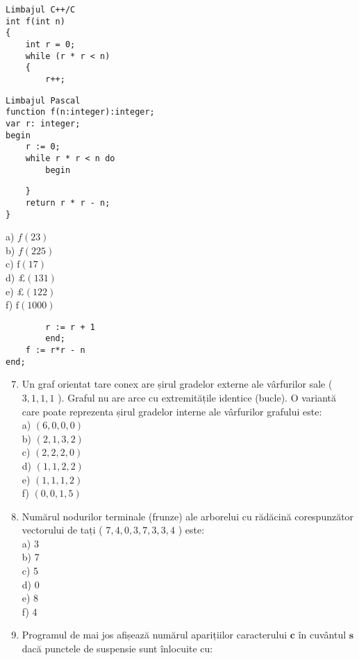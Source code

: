 \begin{verbatim}
Limbajul C++/C
int f(int n)
{
    int r = 0;
    while (r * r < n)
    {
        r++;
\end{verbatim}

\begin{verbatim}
Limbajul Pascal
function f(n:integer):integer;
var r: integer;
begin
    r := 0;
    while r * r < n do
        begin
\end{verbatim}

\begin{verbatim}
    }
    return r * r - n;
}
\end{verbatim}

a) $f(23)$\\
b) $f(225)$\\
c) $\mathrm{f}(17)$\\
d) $\pounds(131)$\\
e) $\pounds(122)$\\
f) $\mathrm{f}(1000)$

\begin{verbatim}
        r := r + 1
        end;
    f := r*r - n
end;
\end{verbatim}

\begin{enumerate}
  \setcounter{enumi}{6}
  \item Un graf orientat tare conex are șirul gradelor externe ale vârfurilor sale ( $3,1,1,1$ ). Graful nu are arce cu extremitățile identice (bucle). O variantă care poate reprezenta șirul gradelor interne ale vârfurilor grafului este:\\
a) $(6,0,0,0)$\\
b) $(2,1,3,2)$\\
c) $(2,2,2,0)$\\
d) $(1,1,2,2)$\\
e) $(1,1,1,2)$\\
f) $(0,0,1,5)$
  \item Numărul nodurilor terminale (frunze) ale arborelui cu rădăcină corespunzător vectorului de tați ( $7,4,0,3,7,3,3,4$ ) este:\\
a) 3\\
b) 7\\
c) 5\\
d) 0\\
e) 8\\
f) 4
  \item Programul de mai jos afișează numărul aparițiilor caracterului $\mathbf{c}$ în cuvântul $\mathbf{s}$ dacă punctele de suspensie sunt înlocuite cu:
\end{enumerate}


